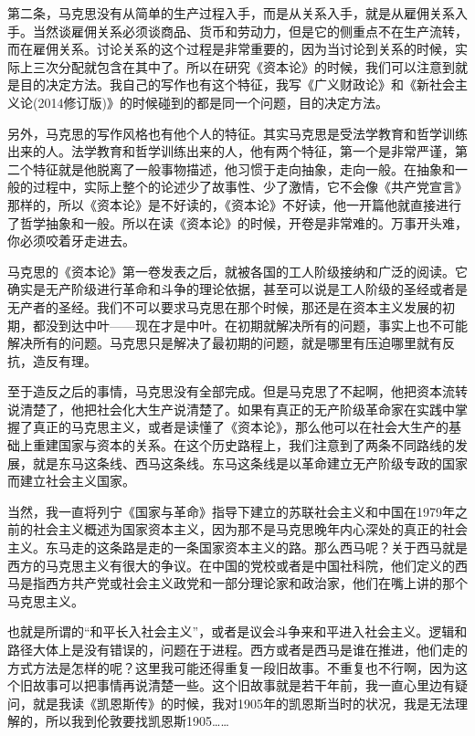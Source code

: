 \documentclass[UTF8, 12pt, a4paper]{ctexrep}
\begin{document}
第二条，马克思没有从简单的生产过程入手，而是从关系入手，就是从雇佣关系入手。当然谈雇佣关系必须谈商品、货币和劳动力，但是它的侧重点不在生产流转，而在雇佣关系。讨论关系的这个过程是非常重要的，因为当讨论到关系的时候，实际上三次分配就包含在其中了。所以在研究《资本论》的时候，我们可以注意到就是目的决定方法。我自己的写作也有这个特征，我写《广义财政论》和《新社会主义论(2014修订版)》的时候碰到的都是同一个问题，目的决定方法。

另外，马克思的写作风格也有他个人的特征。其实马克思是受法学教育和哲学训练出来的人。法学教育和哲学训练出来的人，他有两个特征，第一个是非常严谨，第二个特征就是他脱离了一般事物描述，他习惯于走向抽象，走向一般。在抽象和一般的过程中，实际上整个的论述少了故事性、少了激情，它不会像《共产党宣言》那样的，所以《资本论》是不好读的，《资本论》不好读，他一开篇他就直接进行了哲学抽象和一般。所以在读《资本论》的时候，开卷是非常难的。万事开头难，你必须咬着牙走进去。

马克思的《资本论》第一卷发表之后，就被各国的工人阶级接纳和广泛的阅读。它确实是无产阶级进行革命和斗争的理论依据，甚至可以说是工人阶级的圣经或者是无产者的圣经。我们不可以要求马克思在那个时候，那还是在资本主义发展的初期，都没到达中叶——现在才是中叶。在初期就解决所有的问题，事实上也不可能解决所有的问题。马克思只是解决了最初期的问题，就是哪里有压迫哪里就有反抗，造反有理。

至于造反之后的事情，马克思没有全部完成。但是马克思了不起啊，他把资本流转说清楚了，他把社会化大生产说清楚了。如果有真正的无产阶级革命家在实践中掌握了真正的马克思主义，或者是读懂了《资本论》，那么他可以在社会大生产的基础上重建国家与资本的关系。在这个历史路程上，我们注意到了两条不同路线的发展，就是东马这条线、西马这条线。东马这条线是以革命建立无产阶级专政的国家而建立社会主义国家。

当然，我一直将列宁《国家与革命》指导下建立的苏联社会主义和中国在1979年之前的社会主义概述为国家资本主义，因为那不是马克思晚年内心深处的真正的社会主义。东马走的这条路是走的一条国家资本主义的路。那么西马呢？关于西马就是西方的马克思主义有很大的争议。在中国的党校或者是中国社科院，他们定义的西马是指西方共产党或社会主义政党和一部分理论家和政治家，他们在嘴上讲的那个马克思主义。

也就是所谓的“和平长入社会主义”，或者是议会斗争来和平进入社会主义。逻辑和路径大体上是没有错误的，问题在于进程。西方或者是西马是谁在推进，他们走的方式方法是怎样的呢？这里我可能还得重复一段旧故事。不重复也不行啊，因为这个旧故事可以把事情再说清楚一些。这个旧故事就是若干年前，我一直心里边有疑问，就是我读《凯恩斯传》的时候，我对1905年的凯恩斯当时的状况，我是无法理解的，所以我到伦敦要找凯恩斯1905……
\end{document}
